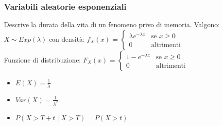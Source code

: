 \documentclass[10pt,a4paper]{article}
\begin{document}
\begin{multicols}{2}
    
    
\subsubsection*{Variabili aleatorie esponenziali}
    Descrive la durata della vita di un fenomeno privo di memoria. Valgono:
    $X \sim Exp(\lambda)$ con densit\`a:
    $f_X(x)$ = $ \begin{cases}
        \lambda e^{-\lambda x} & \text{se } x \geq 0 \\
        0 & \text{altrimenti}
    \end{cases} $\\
    Funzione di distribuzione:
    $F_X(x)$ = $ \begin{cases}
        1-e^{-\lambda x} & \text{se } x \geq 0 \\
        0 & \text{altrimenti}
    \end{cases} $
    
    \begin{itemize}
        \item $E(X) = \frac{1}{\lambda}$
        \item $Var(X) = \frac{1}{\lambda^2}$
        \item $P(X > T+t \mid X > T) = P(X > t)$
    \end{itemize}



\end{multicols}
\end{document}
